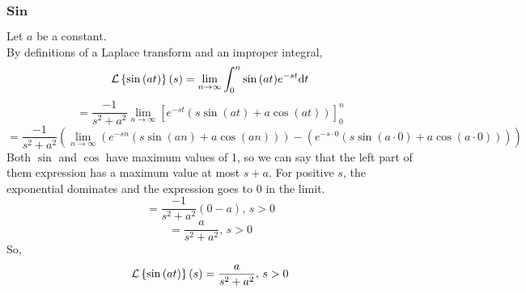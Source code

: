 \noindent
\subsubsection{$\textbf{Sin}$}
Let $a$ be a constant.\\
By definitions of a Laplace transform and an improper integral,
\begin{equation*}
	\mathcal{L}\left\{ \sin{(at)} \right\}\left(s\right) = \lim\limits_{n\to\infty}{\int_{0}^{n}{\sin{(at)}e^{-st}\mathrm{d}t}}
\end{equation*}
\begin{equation*}
	= \frac{-1}{s^2 + a^2}\lim\limits_{n\to\infty}{\left[e^{-st}\left(s\sin{(at)} + a\cos{(at)}\right)\right]_{0}^{n}}
\end{equation*}
\begin{equation*}
	 = \frac{-1}{s^2 + a^2}\left(\lim\limits_{n\to\infty}\left(e^{-sn}\left(s\sin{(an)} + a\cos{(an)}\right)\right) - \left(e^{-s\cdot 0}\left(s\sin{(a\cdot 0)} + a\cos{(a\cdot 0)}\right)\right)\right)
\end{equation*}
Both $\sin$ and $\cos$ have maximum values of 1, so we can say that the left part of them expression has a maximum value at most $s + a$. For positive $s$, the exponential dominates and the expression goes to 0 in the limit.
\begin{equation*}
	 = \frac{-1}{s^2 + a^2}\left(0 - a\right) \text{, } s > 0
\end{equation*}
\begin{equation*}
	 = \frac{a}{s^2 + a^2} \text{, } s > 0
\end{equation*}
So,
\begin{equation*}
	\mathcal{L}\left\{ \sin{(at)} \right\}\left(s\right) = \frac{a}{s^2 + a^2} \text{, } s > 0
\end{equation*}